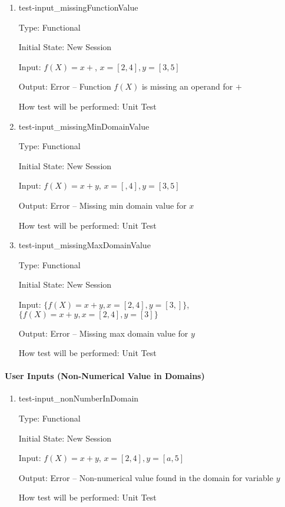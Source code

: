 \documentclass[12pt, titlepage]{article}
\begin{document}
\begin{enumerate}
	
	\item{test-input\_missingFunctionValue}
	
	Type: Functional
	
	Initial State: New Session
	
	Input: $f(X) = x +$, $x = [2,4], y = [3,5]$
	
	Output: Error -- Function $f(X)$ is missing an operand for $+$
	
	How test will be performed: Unit Test\\
	
	\item{test-input\_missingMinDomainValue}
	
	Type: Functional
	
	Initial State: New Session
	
	Input: $f(X) = x + y$, $x = [,4], y = [3,5]$
	
	Output: Error -- Missing min domain value for $x$
	
	How test will be performed: Unit Test\\
	
	\item{test-input\_missingMaxDomainValue}
	
	Type: Functional
	
	Initial State: New Session
	
	Input: $\{f(X) = x + y, x = [2,4], y = [3,]\}$, $\{f(X) = x + y, x = 
	[2,4], y = [3]\}$
	
	Output: Error -- Missing max domain value for $y$
	
	How test will be performed: Unit Test
	
\end{enumerate}

\paragraph{User Inputs (Non-Numerical Value in Domains)}

\begin{enumerate}
	
	\item{test-input\_nonNumberInDomain}
	
	Type: Functional
	
	Initial State: New Session
	
	Input: $f(X) = x + y$, $x = [2,4], y = [a,5]$
	
	Output: Error -- Non-numerical value found in the domain for variable $y$
	
	How test will be performed: Unit Test\\
	
\end{enumerate}
\end{document}
